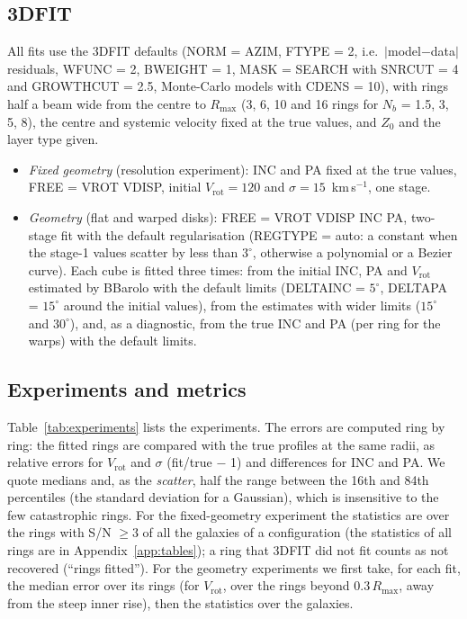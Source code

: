 \documentclass[10pt,a4paper]{article}
\newcommand{\vrot}{V_\mathrm{rot}}
\newcommand{\rmax}{R_\mathrm{max}}
\newcommand{\kms}{km\,s$^{-1}$}
\begin{document}
\subsection{3DFIT}
All fits use the 3DFIT defaults (NORM = AZIM, FTYPE = 2, i.e.\ $|$model$-$data$|$ residuals,
WFUNC = 2, BWEIGHT = 1, MASK = SEARCH with SNRCUT = 4 and GROWTHCUT = 2.5, Monte-Carlo models with
CDENS = 10), with rings half a beam wide from the centre to $\rmax$ (3, 6, 10 and 16 rings for
$N_b$ = 1.5, 3, 5, 8), the centre and systemic velocity fixed at the true values, and $Z_0$ and the
layer type given.
\begin{itemize}
\item \emph{Fixed geometry} (resolution experiment): INC and PA fixed at the true values, FREE = VROT
  VDISP, initial $\vrot = 120$ and $\sigma = 15$~\kms, one stage.
\item \emph{Geometry} (flat and warped disks): FREE = VROT VDISP INC PA, two-stage fit with the
  default regularisation (REGTYPE = auto: a constant when the stage-1 values scatter by less than
  $3^\circ$, otherwise a polynomial or a Bezier curve). Each cube is fitted three times: from the
  initial INC, PA and $\vrot$ estimated by BBarolo with the default limits (DELTAINC = $5^\circ$,
  DELTAPA = $15^\circ$ around the initial values), from the estimates with wider limits ($15^\circ$
  and $30^\circ$), and, as a diagnostic, from the true INC and PA (per ring for the warps) with the
  default limits.
\end{itemize}

\subsection{Experiments and metrics}
Table~\ref{tab:experiments} lists the experiments. The errors are computed ring by ring: the fitted
rings are compared with the true profiles at the same radii, as relative errors for $\vrot$ and
$\sigma$ (fit/true $-$ 1) and differences for INC and PA. We quote medians and, as the
\emph{scatter}, half the range between the 16th and 84th percentiles (the standard deviation for a
Gaussian), which is insensitive to the few catastrophic rings. For the fixed-geometry experiment the
statistics are over the rings with S/N $\geq 3$ of all the galaxies of a configuration (the
statistics of all rings are in Appendix~\ref{app:tables}); a ring that 3DFIT did not fit counts as
not recovered (``rings fitted''). For the geometry experiments we first take, for each fit, the median
error over its rings (for $\vrot$, over the rings beyond $0.3\,\rmax$, away from the steep inner rise),
then the statistics over the galaxies.
\end{document}
